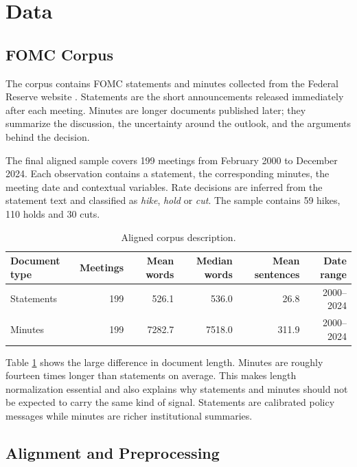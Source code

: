 \documentclass{article}
\begin{document}
\section{Data}

\subsection{FOMC Corpus}

The corpus contains FOMC statements and minutes collected from the Federal Reserve
website \citep{federalreservefomc}. Statements are the short announcements
released immediately after each meeting. Minutes are longer documents published
later; they summarize the discussion, the uncertainty around the outlook, and the
arguments behind the decision.

The final aligned sample covers 199 meetings from February 2000 to December 2024.
Each observation contains a statement, the corresponding minutes, the meeting date
and contextual variables. Rate decisions are inferred from the statement text and
classified as \emph{hike}, \emph{hold} or \emph{cut}. The sample contains 59 hikes,
110 holds and 30 cuts.

\begin{table}[t]
\centering
\caption{Aligned corpus description.}
\label{tab:corpus}
\begin{tabular}{lrrrrr}
\toprule
Document type & Meetings & Mean words & Median words & Mean sentences & Date range \\
\midrule
Statements & 199 & 526.1 & 536.0 & 26.8 & 2000--2024 \\
Minutes & 199 & 7282.7 & 7518.0 & 311.9 & 2000--2024 \\
\bottomrule
\end{tabular}
\end{table}

Table \ref{tab:corpus} shows the large difference in document length. Minutes are
roughly fourteen times longer than statements on average. This makes length
normalization essential and also explains why statements and minutes should not be
expected to carry the same kind of signal. Statements are calibrated policy
messages while minutes are richer institutional summaries.

\subsection{Alignment and Preprocessing}
\end{document}

